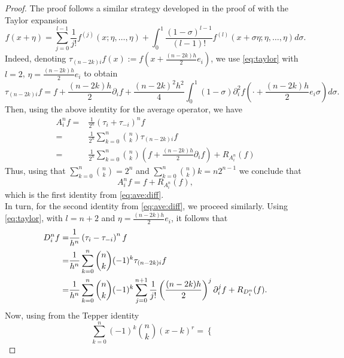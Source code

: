 \documentclass[11pt,oneside,leqno]{amsart}
\numberwithin{equation}{section}
\numberwithin{equation}{section}
\begin{document}
\begin{proof}
The proof follows a similar strategy developed in the proof of \cite[Proposition 4.1]{LOP-2020} with the Taylor expansion \begin{equation}\label{eq:taylor}
 f(x+\eta)=\sum_{j=0}^{l-1}\frac{1}{j!}f^{(j)}(x;\eta,\ldots, \eta)+\int_{0}^{1}\frac{(1-\sigma)^{l-1}}{(l-1)!}f^{(l)}(x+\sigma \eta;\eta,\ldots,\eta)d \sigma.
\end{equation} Indeed, denoting $\displaystyle\tau_{(n-2k)i}f(x):=f\left(x+\frac{(n-2k)h}{2}e_{i}\right)$, we use \eqref{eq:taylor} with $l=2$, $\displaystyle\eta=\frac{(n-2k)h}{2}e_{i}$ to obtain
\begin{equation*}
    \tau_{(n-2k)i}f=f+\frac{(n-2k)h}{2}\partial_{i}f+\frac{(n-2k)^{2}h^{2}}{4}\int_{0}^{1}(1-\sigma)\partial_{i}^{2}f(\cdot+\frac{(n-2k)h}{2}e_{i}\sigma)d\sigma.
\end{equation*}
Then, using the above identity for the average operator, we have 
\begin{align*}
    A_{i}^{n}f=&\frac{1}{2^{n}}\left(\tau_{i}+\tau_{-i} \right) ^{n}f\\
        =&\frac{1}{2^{n}}\sum_{k=0}^{n}\binom{n}{k}\tau_{(n-2k)i}f\\
        =&\frac{1}{2^{n}}\sum_{k=0}^{n}\binom{n}{k}\left(f+\frac{(n-2k)h}{2}\partial_{i}f\right)+R_{A_{i}^{n}}(f)
\end{align*}
Thus, using that $\displaystyle\sum_{k=0}^{n}\binom{n}{k}=2^{n}$ and $\displaystyle\sum_{k=0}^{n}\binom{n}{k}k=n2^{n-1}$ we conclude that
\begin{equation*}
    A_{i}^{n}f=f+R_{A_{i}^{n}}(f),
\end{equation*}
which is the first identity from \eqref{eq:ave:diff}.\\    In turn, for the second identity from \eqref{eq:ave:diff}, we proceed similarly. Using \eqref{eq:taylor}, with $l=n+2$ and $\displaystyle\eta=\frac{(n-2k)h}{2}e_{i}$, it follows that
\begin{align}\label{eq:Df}
    D^{n}_{i}f=&\frac{1}{h^{n}}\left(\tau_{i}-\tau_{-i} \right)^{n}f\notag\\
        =&\frac{1}{h^{n}}\sum_{k=0}^{n}\binom{n}{k}(-1)^{k}\tau_{(n-2k)i}f\\
        =&\frac{1}{h^{n}}\sum_{k=0}^{n}\binom{n}{k}(-1)^{k}\sum_{j=0}^{n+1}\frac{1}{j!}\left(\frac{(n-2k)h}{2} \right)^{j}\partial_{i}^{j}f+R_{D_{i}^{n}}(f).\notag
        \end{align}
Now, using from \cite[Equation 2.2]{egorychev} the Tepper identity  
$$\displaystyle\sum_{k=0}^{n}(-1)^{k}\binom{n}{k}(x-k)^{r}=\begin{cases}

\end{cases}$$
\end{proof}
\end{document}
